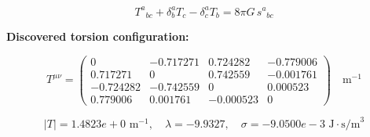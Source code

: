 
\begin{equation}
  T^a{}_{bc} + \delta^a_b T_c - \delta^a_c T_b = 8\pi G \, s^a{}_{bc}
\end{equation}

\textbf{Discovered torsion configuration:}

\begin{equation}
  T^{\mu\nu} = \begin{pmatrix}
    0 & -0.717271 & 0.724282 & -0.779006 \\
    0.717271 & 0 & 0.742559 & -0.001761 \\
    -0.724282 & -0.742559 & 0 & 0.000523 \\
    0.779006 & 0.001761 & -0.000523 & 0
  \end{pmatrix} \quad \text{m}^{-1}
\end{equation}

\begin{equation}
  |T| = 1.4823e+0 \text{ m}^{-1}, \quad
  \lambda = -9.9327, \quad
  \sigma = -9.0500e-3 \text{ J}\cdot\text{s/m}^3
\end{equation}
